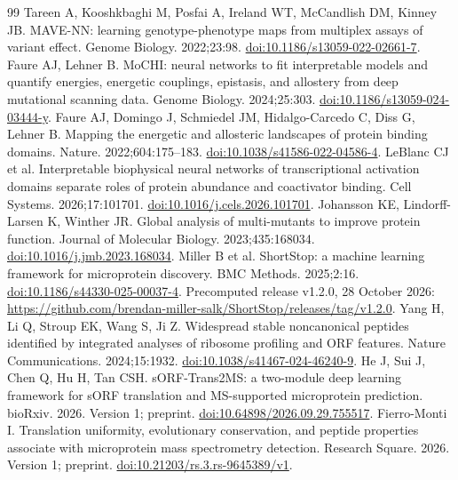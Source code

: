 \documentclass[11pt,a4paper]{article}
\begin{document}
\begin{thebibliography}{99}
 Tareen A, Kooshkbaghi M, Posfai A, Ireland WT, McCandlish DM, Kinney JB. MAVE-NN: learning genotype-phenotype maps from multiplex assays of variant effect. Genome Biology. 2022;23:98. \href{https://doi.org/10.1186/s13059-022-02661-7}{doi:10.1186/s13059-022-02661-7}.
 Faure AJ, Lehner B. MoCHI: neural networks to fit interpretable models and quantify energies, energetic couplings, epistasis, and allostery from deep mutational scanning data. Genome Biology. 2024;25:303. \href{https://doi.org/10.1186/s13059-024-03444-y}{doi:10.1186/s13059-024-03444-y}.
 Faure AJ, Domingo J, Schmiedel JM, Hidalgo-Carcedo C, Diss G, Lehner B. Mapping the energetic and allosteric landscapes of protein binding domains. Nature. 2022;604:175--183. \href{https://doi.org/10.1038/s41586-022-04586-4}{doi:10.1038/s41586-022-04586-4}.
 LeBlanc CJ et al. Interpretable biophysical neural networks of transcriptional activation domains separate roles of protein abundance and coactivator binding. Cell Systems. 2026;17:101701. \href{https://doi.org/10.1016/j.cels.2026.101701}{doi:10.1016/j.cels.2026.101701}.
 Johansson KE, Lindorff-Larsen K, Winther JR. Global analysis of multi-mutants to improve protein function. Journal of Molecular Biology. 2023;435:168034. \href{https://doi.org/10.1016/j.jmb.2023.168034}{doi:10.1016/j.jmb.2023.168034}.
 Miller B et al. ShortStop: a machine learning framework for microprotein discovery. BMC Methods. 2025;2:16. \href{https://doi.org/10.1186/s44330-025-00037-4}{doi:10.1186/s44330-025-00037-4}. Precomputed release v1.2.0, 28 October 2026: \url{https://github.com/brendan-miller-salk/ShortStop/releases/tag/v1.2.0}.
 Yang H, Li Q, Stroup EK, Wang S, Ji Z. Widespread stable noncanonical peptides identified by integrated analyses of ribosome profiling and ORF features. Nature Communications. 2024;15:1932. \href{https://doi.org/10.1038/s41467-024-46240-9}{doi:10.1038/s41467-024-46240-9}.
 He J, Sui J, Chen Q, Hu H, Tan CSH. sORF-Trans2MS: a two-module deep learning framework for sORF translation and MS-supported microprotein prediction. bioRxiv. 2026. Version 1; preprint. \href{https://doi.org/10.64898/2026.09.29.755517}{doi:10.64898/2026.09.29.755517}.
 Fierro-Monti I. Translation uniformity, evolutionary conservation, and peptide properties associate with microprotein mass spectrometry detection. Research Square. 2026. Version 1; preprint. \href{https://doi.org/10.21203/rs.3.rs-9645389/v1}{doi:10.21203/rs.3.rs-9645389/v1}.

\end{thebibliography}
\end{document}
